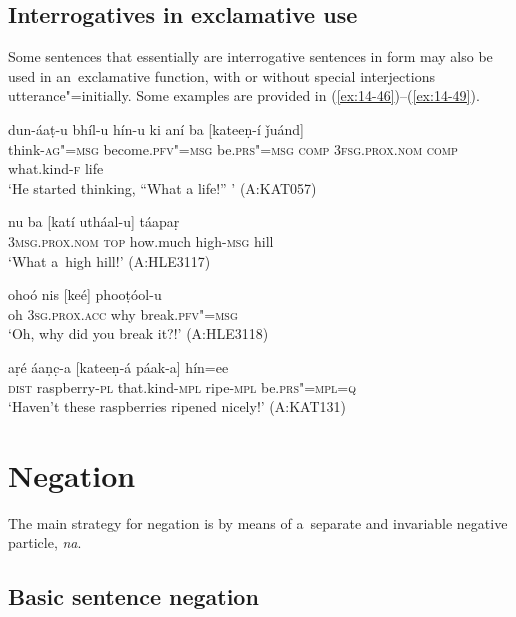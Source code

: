 \subsection{Interrogatives in exclamative use}
\label{subsec:14-2-4}

Some sentences that essentially are interrogative sentences in form may also be used in an~exclamative function, with or without special interjections utterance"=initially. Some examples are provided in (\ref{ex:14-46})--(\ref{ex:14-49}). 

\begin{exe}
\ex
\label{ex:14-46}
\gll dun-áaṭ-u bhíl-u hín-u ki  aní ba [kateeṇ-í ǰuánd] \\
think-\textsc{ag"=msg} become.\textsc{pfv"=msg} be.\textsc{prs"=msg} \textsc{comp}  \textsc{3fsg.prox.nom} \textsc{comp} what.kind-\textsc{f} life  \\
\glt `He started thinking, ``What a life!'' ' (A:KAT057)

\ex
\label{ex:14-47}
\gll nu ba [katí utháal-u] táapaṛ \\
\textsc{3msg.prox.nom} \textsc{top} how.much high-\textsc{msg} hill  \\
\glt `What a~high hill!' (A:HLE3117)

\ex
\label{ex:14-48}
\gll ohoó nis [keé] phooṭóol-u \\
oh \textsc{3sg.prox.acc} why break.\textsc{pfv"=msg} \\
\glt `Oh, why did you break it?!' (A:HLE3118)

\ex
\label{ex:14-49}
\gll aṛé áaṇc̣-a [kateeṇ-á páak-a] hín=ee \\
\textsc{dist} raspberry-\textsc{pl} that.kind-\textsc{mpl} ripe-\textsc{mpl} be.\textsc{prs"=mpl=q} \\
\glt `Haven't these raspberries ripened nicely!' (A:KAT131)
\end{exe}

\section{Negation}
\label{sec:14-3}


The main strategy for negation is by means of a~separate and invariable negative particle, \textit{na}. 


\subsection{Basic sentence negation}
\label{subsec:14-3-1}


